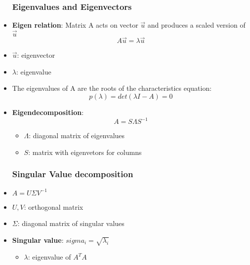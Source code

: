 \begin{itemize}
\subsubsection{Eigenvalues and Eigenvectors}
	\item \textbf{Eigen relation}: Matrix A acts on vector $\vec{u}$ and produces a scaled version of $\vec{u}$
	$$A\vec{u}=\lambda\vec{u}$$
	\item $\vec{u}$: eigenvector
	\item $\lambda$: eigenvalue
	\item The eigenvalues of A are the roots of the characteristics equation:
	$$p(\lambda)=det(\lambda I-A)=0$$
	\item \textbf{Eigendecomposition}:
	$$A=S\Lambda S^{-1}$$
	\begin{itemize}
		\item $\Lambda$: diagonal matrix of eigenvalues
		\item $S$: matrix with eigenvetors for columns
	\end{itemize}
\subsubsection{Singular Value decomposition}
	\item $A=U\Sigma V^{-1}$
	\item $U, V$: orthogonal matrix
	\item $\Sigma$: diagonal matrix of singular values
	\item \textbf{Singular value}: $sigma_i=\sqrt{\lambda_i}$
	\begin{itemize}
		\item $\lambda$: eigenvalue of $A^{T}A$
	\end{itemize}
\end{itemize}

